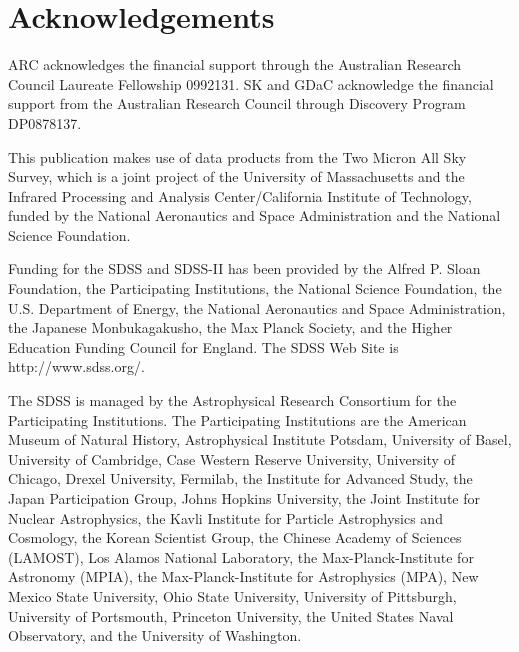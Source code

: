 \documentclass[preprint2]{aastex}
\begin{document}
	
\section{Acknowledgements}
ARC acknowledges the financial support through the Australian Research Council Laureate Fellowship 0992131. SK and GDaC acknowledge the financial support from the Australian Research Council through Discovery Program DP0878137.

This publication makes use of data products from the Two Micron All Sky Survey, which is a joint project of the University of Massachusetts and the Infrared Processing and Analysis Center/California Institute of Technology, funded by the National Aeronautics and Space Administration and the National Science Foundation.

Funding for the SDSS and SDSS-II has been provided by the Alfred P. Sloan Foundation, the Participating Institutions, the National Science Foundation, the U.S. Department of Energy, the National Aeronautics and Space Administration, the Japanese Monbukagakusho, the Max Planck Society, and the Higher Education Funding Council for England. The SDSS Web Site is http://www.sdss.org/.

The SDSS is managed by the Astrophysical Research Consortium for the Participating Institutions. The Participating Institutions are the American Museum of Natural History, Astrophysical Institute Potsdam, University of Basel, University of Cambridge, Case Western Reserve University, University of Chicago, Drexel University, Fermilab, the Institute for Advanced Study, the Japan Participation Group, Johns Hopkins University, the Joint Institute for Nuclear Astrophysics, the Kavli Institute for Particle Astrophysics and Cosmology, the Korean Scientist Group, the Chinese Academy of Sciences (LAMOST), Los Alamos National Laboratory, the Max-Planck-Institute for Astronomy (MPIA), the Max-Planck-Institute for Astrophysics (MPA), New Mexico State University, Ohio State University, University of Pittsburgh, University of Portsmouth, Princeton University, the United States Naval Observatory, and the University of Washington.


	
\end{document}
